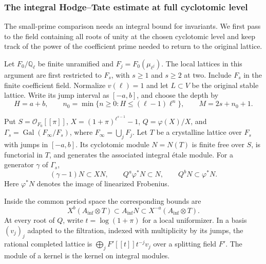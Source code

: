 \subsubsection*{The integral Hodge--Tate estimate at full cyclotomic level}
\label{subsec:ramified-ht}
\hypertarget{source-ramified-cyclotomic}{}

The small-prime comparison needs an integral bound for invariants. We first pass to the field containing all roots of unity at the chosen cyclotomic level and keep track of the power of the coefficient prime needed to return to the original lattice.

Let \(F_0/\mathbb Q_\ell\) be finite unramified and
\(F_j=F_0(\mu_{\ell^j})\). The local lattices in this
argument are first restricted to \(F_s\), with \(s\ge1\)
and \(s\ge2\) at two. Include \(F_s\) in the finite
coefficient field. Normalize \(v(\ell)=1\) and let
\(L\subset V\) be the original stable lattice.
Write its jump interval as \([-a,b]\), and choose the depth by
\[
 H=a+b,\qquad n_0=\min\{n\ge0:H\le(\ell-1)\ell^n\},\qquad M=2s+n_0+1.
\]

\begin{proposition}
\label{prop:ramified-integral-wach-comparison}\label{hyp:ramified-integral-wach-comparison}
Put \(S=\mathcal O_{F_0}[[\pi]]\), \(X=(1+\pi)^{\ell^{s-1}}-1\), \(Q=\varphi(X)/X\), and \(\Gamma_s=\operatorname{Gal}(F_\infty/F_s)\), where \(F_\infty=\bigcup_jF_j\). Let \(T\) be a crystalline lattice over \(F_s\) with jumps in \([-a,b]\). Its cyclotomic module \(N=N(T)\) is finite free over \(S\), is functorial in \(T\), and generates the associated integral étale module. For a generator \(\gamma\) of \(\Gamma_s\),
\[
 (\gamma-1)N\subset XN,\qquad
 Q^a\varphi^*N\subset N,\qquad Q^bN\subset\varphi^*N.
\]
Here \(\varphi^*N\) denotes the image of linearized Frobenius.

Inside the common period space the corresponding bounds are
\[
  X^b(A_{\inf}\otimes T)\subset A_{\inf}N
                     \subset X^{-a}(A_{\inf}\otimes T).
\]
At every root of \(Q\), write \(t=\log(1+\pi)\) for a local uniformizer. In a basis \((v_j)_j\) adapted to the filtration, indexed with multiplicity by its jumps, the rational completed lattice is \(\bigoplus_j F'[[t]]t^{-j}v_j\) over a splitting field \(F'\). The module of a kernel is the kernel on integral modules.
\end{proposition}

